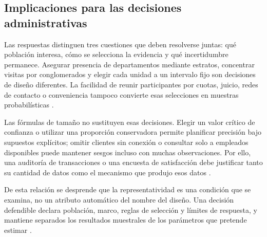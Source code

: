 \subsection{Implicaciones para las decisiones administrativas}
Las respuestas distinguen tres cuestiones que deben resolverse juntas: qué población interesa, cómo se selecciona la evidencia y qué incertidumbre permanece. Asegurar presencia de departamentos mediante estratos, concentrar visitas por conglomerados y elegir cada unidad a un intervalo fijo son decisiones de diseño diferentes. La facilidad de reunir participantes por cuotas, juicio, redes de contacto o conveniencia tampoco convierte esas selecciones en muestras probabilísticas \citep{holmesBusiness2023}.

Las fórmulas de tamaño no sustituyen esas decisiones. Elegir un valor crítico de confianza o utilizar una proporción conservadora permite planificar precisión bajo supuestos explícitos; omitir clientes sin conexión o consultar solo a empleados disponibles puede mantener sesgos incluso con muchas observaciones. Por ello, una auditoría de transacciones o una encuesta de satisfacción debe justificar tanto su cantidad de datos como el mecanismo que produjo esos datos \citep{bradley2021}.

De esta relación se desprende que la representatividad es una condición que se examina, no un atributo automático del nombre del diseño. Una decisión defendible declara población, marco, reglas de selección y límites de respuesta, y mantiene separados los resultados muestrales de los parámetros que pretende estimar \citep{wackerly2010}.

